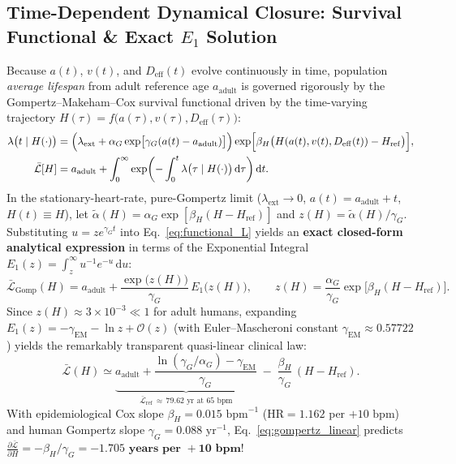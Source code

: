 \documentclass[11pt,a4paper]{article}
\newcommand{\dd}{\mathrm{d}}
\newcommand{\pd}[2]{\frac{\partial #1}{\partial #2}}
\newcommand{\Lbar}{\bar{\mathcal{L}}}
\newcommand{\Deff}{D_{\mathrm{eff}}}
\begin{document}
\subsection{Time-Dependent Dynamical Closure: Survival Functional \& Exact $E_1$ Solution}
Because $a(t)$, $v(t)$, and $\Deff(t)$ evolve continuously in time, population \emph{average lifespan} from adult reference age $a_{\mathrm{adult}}$ is governed rigorously by the Gompertz--Makeham--Cox survival functional driven by the time-varying trajectory $H(\tau) = f\bigl(a(\tau), v(\tau), \Deff(\tau)\bigr)$:
\begin{align}
  \lambda\bigl(t \mid H(\cdot)\bigr) &= \Bigl(\lambda_{\mathrm{ext}} + \alpha_G \exp\bigl[\gamma_G (a(t) - a_{\mathrm{adult}})\bigr]\Bigr) \exp\Bigl[\beta_H\bigl(H(a(t), v(t), \Deff(t)) - H_{\mathrm{ref}}\bigr)\Bigr], \label{eq:hazard}\\
  \Lbar[H] &= a_{\mathrm{adult}} + \int_0^\infty \exp\!\left(-\int_0^t \lambda\bigl(\tau \mid H(\cdot)\bigr)\,\dd\tau\right)\dd t. \label{eq:functional_L}
\end{align}
In the stationary-heart-rate, pure-Gompertz limit ($\lambda_{\mathrm{ext}} \to 0$, $a(t) = a_{\mathrm{adult}} + t$, $H(t) \equiv H$), let $\tilde{\alpha}(H) = \alpha_G \exp[\beta_H(H - H_{\mathrm{ref}})]$ and $z(H) = \tilde{\alpha}(H)/\gamma_G$. Substituting $u = z e^{\gamma_G t}$ into Eq.~\eqref{eq:functional_L} yields an \textbf{exact closed-form analytical expression} in terms of the Exponential Integral $E_1(z) = \int_z^\infty u^{-1}e^{-u}\,\dd u$:
\begin{equation}
  \Lbar_{\mathrm{Gomp}}(H) = a_{\mathrm{adult}} + \frac{\exp\!\bigl(z(H)\bigr)}{\gamma_G}\,E_1\!\bigl(z(H)\bigr),
  \qquad z(H) = \frac{\alpha_G}{\gamma_G}\exp\!\bigl[\beta_H(H - H_{\mathrm{ref}})\bigr].
  \label{eq:gompertz_exact}
\end{equation}
Since $z(H) \approx 3\times 10^{-3} \ll 1$ for adult humans, expanding $E_1(z) = -\gamma_{\mathrm{EM}} - \ln z + \mathcal{O}(z)$ (with Euler--Mascheroni constant $\gamma_{\mathrm{EM}} \approx 0.57722$) yields the remarkably transparent quasi-linear clinical law:
\begin{equation}
  \Lbar(H) \simeq \underbrace{a_{\mathrm{adult}} + \frac{\ln(\gamma_G/\alpha_G) - \gamma_{\mathrm{EM}}}{\gamma_G}}_{\Lbar_{\mathrm{ref}} \,\approx\, 79.62\text{ yr at } 65\text{ bpm}} \;-\; \frac{\beta_H}{\gamma_G}\,(H - H_{\mathrm{ref}}).
  \label{eq:gompertz_linear}
\end{equation}
With epidemiological Cox slope $\beta_H = 0.015\text{ bpm}^{-1}$ ($\mathrm{HR} = 1.162$ per $+10\text{ bpm}$) and human Gompertz slope $\gamma_G = 0.088\text{ yr}^{-1}$, Eq.~\eqref{eq:gompertz_linear} predicts $\pd{\Lbar}{H} = -\beta_H/\gamma_G = \mathbf{-1.705\text{ years per }+10\text{ bpm}}$!
\end{document}
